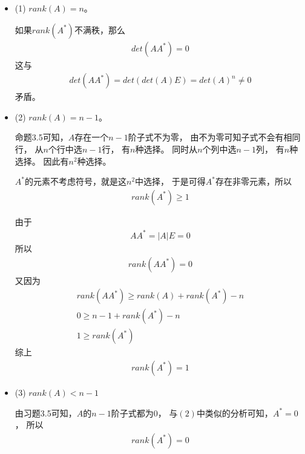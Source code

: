 \documentclass{article}
\begin{document}
\begin{itemize}
  \item (1) $rank(A) = n$。

        如果$rank(A^{*})$不满秩，那么
        \begin{align*}
          det(A A^{*}) = 0
        \end{align*}
        这与
        \begin{align*}
          det(A A^{*}) = det(det(A) E) = det(A)^n \neq 0
        \end{align*}
        矛盾。

  \item (2) $rank(A) = n - 1$。

        命题3.5可知，$A$存在一个$n - 1$阶子式不为零，
        由不为零可知子式不会有相同行，
        从$n$个行中选$n - 1$行，
        有$n$种选择。
        同时从$n$个列中选$n - 1$列，
        有$n$种选择。
        因此有$n^2$种选择。

        $A^{*}$的元素不考虑符号，就是这$n^2$中选择，
        于是可得$A^{*}$存在非零元素，所以
        \begin{align*}
          rank(A^{*}) \geq 1
        \end{align*}

        由于
        \begin{align*}
          A A^{*} = |A|E = 0
        \end{align*}
        所以
        \begin{align*}
          rank(A A^{*}) = 0
        \end{align*}
        又因为
        \begin{align*}
          rank(A A^{*}) \geq rank(A) + rank(A^{*}) - n \\
          0 \geq n - 1 + rank(A^{*}) - n               \\
          1 \geq rank(A^{*})
        \end{align*}
        综上
        \begin{align*}
          rank(A^{*}) = 1
        \end{align*}

  \item (3) $rank(A) < n - 1$

        由习题3.5可知，$A$的$n - 1$阶子式都为$0$，
        与$(2)$中类似的分析可知，$A^{*} = 0$，
        所以
        \begin{align*}
          rank(A^{*}) = 0
        \end{align*}

\end{itemize}
\end{document}
